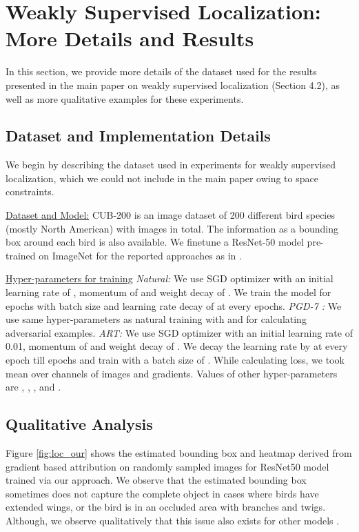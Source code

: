 \documentclass[runningheads]{llncs}
\begin{document}
\section{Weakly Supervised Localization: More Details and Results}\label{wsol_additional}
\label{sec_wsol_addl_results}
In this section, we provide more details of the dataset used for the results presented in the main paper on weakly supervised localization (Section 4.2), as well as more qualitative examples for these experiments.


\subsection{Dataset and Implementation Details}\label{wsol_dataset}
We begin by describing the dataset used in experiments for weakly supervised localization, which we could not include in the main paper owing to space constraints.

\noindent \underline{Dataset and Model:} CUB-200 \cite{cub} is an image dataset of 200 different bird species (mostly North American) with  images in total. The information as a bounding box around each bird is also available. We finetune a ResNet-50 \cite{resnet} model pre-trained on ImageNet for the reported approaches as in \cite{adl}.


\noindent \underline{Hyper-parameters for training} \newline
\textit{Natural:} We use SGD optimizer with an initial learning rate of , momentum of  and  weight decay of . We train the model for  epochs with batch size  and learning rate decay of  at every  epochs.\newline
\textit{PGD-7 \cite{madrypgd}:} We use same hyper-parameters as natural training with  and  for calculating adversarial examples. \newline
\textit{ART:} We use SGD optimizer with an initial learning rate of 0.01, momentum of  and  weight decay of . We decay the learning rate by  at every  epoch till  epochs and train with a batch size of . While calculating  loss, we took mean over channels of images and gradients. Values of other hyper-parameters are , , ,  and . 

\subsection{Qualitative Analysis}
Figure \ref{fig:loc_our} shows the estimated bounding box and heatmap derived from gradient based attribution \cite{attr2013gradient} on randomly sampled images for ResNet50 model trained via our approach. We observe that the estimated bounding box sometimes does not capture the complete object in cases where birds have extended wings, or the bird is in an occluded area with branches and twigs. Although, we observe qualitatively that this issue also exists for other models \cite{adl}.
\end{document}
